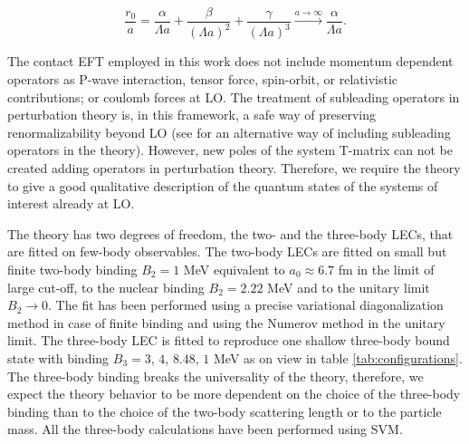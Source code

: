 \documentclass[preprint,12pt]{elsarticle}
\begin{document}
\begin{equation}
    \frac{r_0}{a} = \frac{ \alpha}{\Lambda a}+ \frac{\beta}{(\Lambda a)^2}+ \frac{\gamma}{(\Lambda a)^3} \xrightarrow[]{a\rightarrow\infty} \frac{\alpha}{\Lambda a}.
    \label{eq:philips_effr}
\end{equation}


The contact EFT employed in this work does not include momentum dependent operators as P-wave interaction, tensor force, spin-orbit, or relativistic contributions; or coulomb forces at LO.
The treatment of subleading operators in perturbation theory is, in this framework, a safe way of preserving renormalizability beyond LO (see \cite{Beck:2019abp, Epelbaum:2018zli} for an alternative way of including subleading operators in the theory).
However, new poles of the system T-matrix can not be created adding operators in perturbation theory.
Therefore, we require the theory to give a good qualitative description of the quantum states of the systems of interest already at LO.

The theory has two degrees of freedom, the two- and the three-body LECs, that are fitted on few-body observables.  
The two-body LECs are fitted on small but finite two-body binding $B_2=1$ MeV equivalent to $a_0\approx6.7$ fm in the limit of large cut-off, to the nuclear binding $B_2=2.22$ MeV and to the unitary limit $B_2\rightarrow0$.
The fit has been performed using a precise variational diagonalization method in case of finite binding and using the Numerov method in the unitary limit.
The three-body LEC is fitted to reproduce one shallow three-body bound state with binding $B_3=3$, $4$, $8.48$, $1$ MeV as on view in table  \ref{tab:configurations}.
The three-body binding breaks the universality of the theory, therefore, we expect the theory behavior to be more dependent on the choice of the three-body binding than to the choice of the two-body scattering length or to the particle mass.
All the three-body calculations have been performed using SVM.



\end{document}
